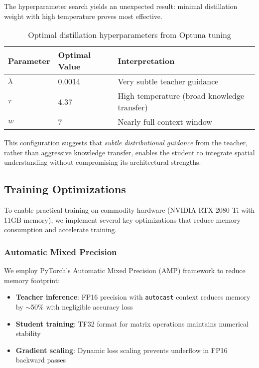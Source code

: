 The hyperparameter search yields an unexpected result: minimal distillation weight with high temperature proves most effective.

\begin{table}[h]
\centering
\caption{Optimal distillation hyperparameters from Optuna tuning}
\label{tab:optimal-hparams}
\small
\begin{tabular}{lll}
\toprule
\textbf{Parameter} & \textbf{Optimal Value} & \textbf{Interpretation} \\
\midrule
$\lambda$ & 0.0014 & Very subtle teacher guidance \\
$\tau$ & 4.37 & High temperature (broad knowledge transfer) \\
$w$ & 7 & Nearly full context window \\
\bottomrule
\end{tabular}
\end{table}

This configuration suggests that \emph{subtle distributional guidance} from the teacher, rather than aggressive knowledge transfer, enables the student to integrate spatial understanding without compromising its architectural strengths.

\subsection{Training Optimizations}
\label{sec:impl-opt}

To enable practical training on commodity hardware (NVIDIA RTX 2080 Ti with 11GB memory), we implement several key optimizations that reduce memory consumption and accelerate training.

\subsubsection{Automatic Mixed Precision}

We employ PyTorch's Automatic Mixed Precision (AMP) framework to reduce memory footprint:

\begin{itemize}[noitemsep,topsep=0pt]
\item \textbf{Teacher inference}: FP16 precision with \texttt{autocast} context reduces memory by $\sim$50\% with negligible accuracy loss
\item \textbf{Student training}: TF32 format for matrix operations maintains numerical stability
\item \textbf{Gradient scaling}: Dynamic loss scaling prevents underflow in FP16 backward passes
\end{itemize}

